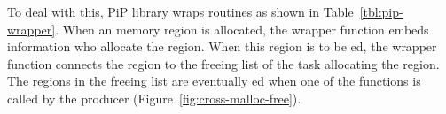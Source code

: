 To deal with this, PiP library wraps  routines as shown in
Table~\ref{tbl:pip-wrapper}. When an memory region is allocated, the
 wrapper function embeds information who allocate the
region. When this region is to be ed, the
 wrapper function connects the region to the freeing
list of the task allocating the region. The regions in the freeing
list are eventually ed when one of the 
functions is called by the producer
(Figure~\ref{fig:cross-malloc-free}).  
